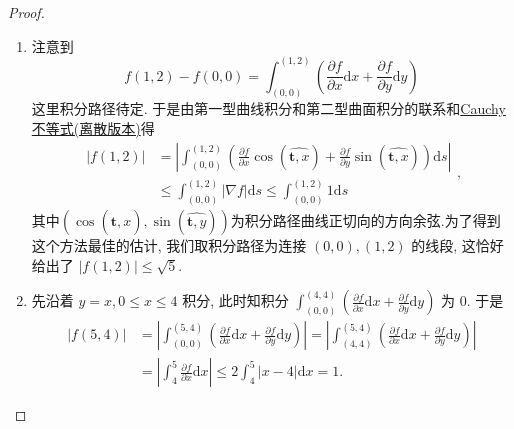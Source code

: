 \documentclass[../../main.tex]{subfiles}%
\begin{document}
\begin{proof}
\begin{enumerate}
\item 注意到
\[
f(1,2) - f(0,0) = \int_{(0,0)}^{(1,2)} \left( \frac{\partial f}{\partial x} \mathrm{d}x + \frac{\partial f}{\partial y} \mathrm{d}y \right)
\]
这里积分路径待定. 于是由第一型曲线积分和第二型曲面积分的联系和\hyperref[theorem:Cauchy不等式(离散版)]{Cauchy不等式(离散版本)}得
\[
\begin{aligned}
|f(1,2)| &= \left| \int_{(0,0)}^{(1,2)} \left( \frac{\partial f}{\partial x} \cos \left( \widehat{\boldsymbol{t},x} \right)  + \frac{\partial f}{\partial y} \sin \left( \widehat{\boldsymbol{t},x} \right)  \right) \mathrm{d}s \right| \\
&\leqslant \int_{(0,0)}^{(1,2)} |\nabla f| \mathrm{d}s \leqslant \int_{(0,0)}^{(1,2)} 1 \mathrm{d}s
\end{aligned},
\]
其中$\left( \cos \left( \widehat{\boldsymbol{t},x} \right) ,\sin \left( \widehat{\boldsymbol{t},y} \right) \right) $为积分路径曲线正切向的方向余弦.为了得到这个方法最佳的估计, 我们取积分路径为连接 \( (0,0),(1,2) \) 的线段, 这恰好给出了 \( |f(1,2)| \leqslant \sqrt{5} \).

\item 先沿着 \( y = x, 0 \leqslant x \leqslant 4 \) 积分, 此时知积分 \( \int_{(0,0)}^{(4,4)} \left( \frac{\partial f}{\partial x} \mathrm{d}x + \frac{\partial f}{\partial y} \mathrm{d}y \right) \) 为 0. 于是
\[
\begin{aligned}
|f(5,4)| &= \left| \int_{(0,0)}^{(5,4)} \left( \frac{\partial f}{\partial x} \mathrm{d}x + \frac{\partial f}{\partial y} \mathrm{d}y \right) \right| = \left| \int_{(4,4)}^{(5,4)} \left( \frac{\partial f}{\partial x} \mathrm{d}x + \frac{\partial f}{\partial y} \mathrm{d}y \right) \right| \\
&= \left| \int_{4}^{5} \frac{\partial f}{\partial x} \mathrm{d}x \right| \leqslant 2 \int_{4}^{5} |x - 4| \mathrm{d}x = 1.
\end{aligned}
\]
\end{enumerate}

\end{proof}
\end{document}
